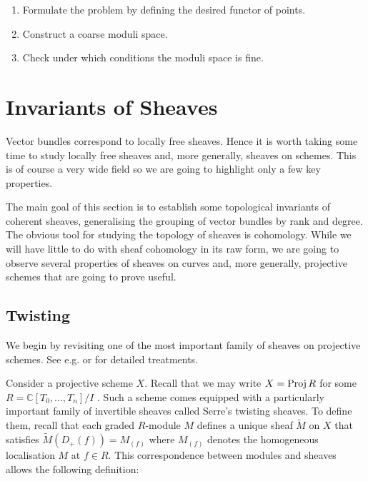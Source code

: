 \documentclass[12pt]{ociamthesis}  %
\begin{document}
\begin{enumerate}
  \item Formulate the problem by defining the desired functor of
        points.
  \item Construct a coarse moduli space.
  \item Check under which conditions the moduli space is fine.
\end{enumerate}

\section{Invariants of Sheaves}

Vector bundles correspond to locally free sheaves. Hence it is worth
taking some time to study locally free sheaves and, more generally,
sheaves on schemes. This is of course a very wide field
so we are going to highlight only a few key properties.

The main goal of this section is to establish some topological
invariants of coherent sheaves, generalising the grouping of
vector bundles by rank and degree. The obvious tool for studying
the topology of sheaves is cohomology. While we will have little
to do with sheaf cohomology in its raw form, we are going to
observe several properties of sheaves on curves and, more generally,
projective schemes that are going to prove useful.

\subsection{Twisting}

We begin by revisiting one of the most important family of sheaves
on projective schemes. See e.g. \cite{gortz2010} or
\cite{hartshorne1977} for detailed treatments.

Consider a projective scheme $X$. Recall that we may write
$X=\operatorname{Proj} R$ for some $R=\mathbb{C}[T_0,\ldots,T_n]/I$ \cite[II Corollary 5.16]{hartshorne1977}. Such a scheme comes
equipped with a particularly important family of invertible sheaves
called Serre's twisting sheaves. To define them, recall that each
graded $R$-module $M$ defines a unique sheaf $\tilde M$ on $X$
that satisfies $\tilde M (D_+(f)) = M_{(f)}$ where $M_{(f)}$
denotes the homogeneous localisation $M$ at $f\in R$. This
correspondence between modules and sheaves allows the following
definition:
\end{document}
